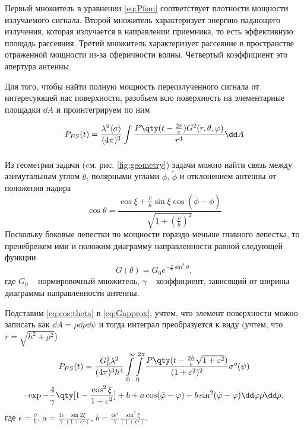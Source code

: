 Первый множитель в уравнении  \eqref{eq:Pfsm}  соответствует плотности мощности
излучаемого сигнала. Второй множитель характеризует энергию падающего
излучения, которая излучается в направлении приемника, то есть эффективную
площадь рассеяния. Третий множитель
характеризует рассеяние в пространстве отраженной мощности из-за
сферичности волны. Четвертый
коэффициент это апертура антенны.



Для того, чтобы найти полную мощность переизлученного сигнала от интересующей
нас поверхности,
разобьем всю поверхность на элементарные площадки $\dd A$ и проинтегрируем
по ним 

\begin{equation}
    P_{FS}(t) = \frac{\lambda^2\mean{\sigma}}{(4 \pi)^3 } \int\limits_{} 
    \frac
        {P\qty(t - \frac{2r}{c}) G^2(r,\theta,\phi) }
        {r^4} 
    \dd A
\end{equation}

 Из геометрии задачи (cм. рис. \ref{fig:geometry}) задачи можно найти связь между
 азимутальным углом $\theta$, полярными углами  $\phi$,  $\tilde \phi$ и
 отклонением антенны от положения надира
 \begin{equation}
     \label{eq:cos:theta}
     \cos \theta = 
     \frac{\cos \xi + \frac{\rho}{h} \sin \xi \cos(\tilde \phi - \phi)}{\sqrt{1
     + (\frac{\rho}{h})^2}}
 \end{equation}
 Поскольку боковые лепестки по мощности гораздо меньше главного лепестка, то
 пренебрежем ими и положим диаграмму направленности   равной следующей функции
 \begin{equation}
     \label{eq:Gapprox}
     G(\theta) = G_0 e^{-\frac{2}{\gamma} \sin^2 \theta},
 \end{equation}
 где $G_0$ -- нормировочный множитель,  $\gamma$ -- коэффициент, зависящий от
 ширины диаграммы направленности антенны.

 Подставим \eqref{eq:cos:theta} в \eqref{eq:Gapprox}, учтем, что  элемент
 поверхности можно записать как $\dd A = \rho \dd \rho \dd \psi$ и тогда
 интеграл преобразуется к виду  (учтем, что \newline$r = \sqrt{h^{2} + \rho^{2}}$)
 \begin{multline}
     P_{FS}(t) = \frac{G_0^2 \lambda^2}{(4 \pi)^3 h^4}
     \int\limits_{0}^{\infty} \int\limits_{0}^{2 \pi}   
     \frac{P\qty(t - \frac{2h}{c}\sqrt{1+ \epsilon^2})}{(1+\epsilon^2)^2} \sigma^o(\psi)
     \\
     \cdot \exp{-\frac{4}{\gamma} \qty[1 - \frac{\cos^2 \xi}{1+ \epsilon^2}] + b
     + a\cos(\tilde \phi - \phi) - b \sin^2(\tilde \phi - \phi)} \dd \phi \rho
     \dd \rho,
 \end{multline}
 где 
 $\displaystyle \epsilon = \frac{\rho}{h}$,
 $\displaystyle a = \frac{4\epsilon}{\gamma} \frac{\sin 2 \xi}{(1+ \epsilon^2)}$,
 $\displaystyle b= \frac{4\epsilon^2}{\gamma} \frac{\sin^2 \xi}{(1+\epsilon^2)}$.

